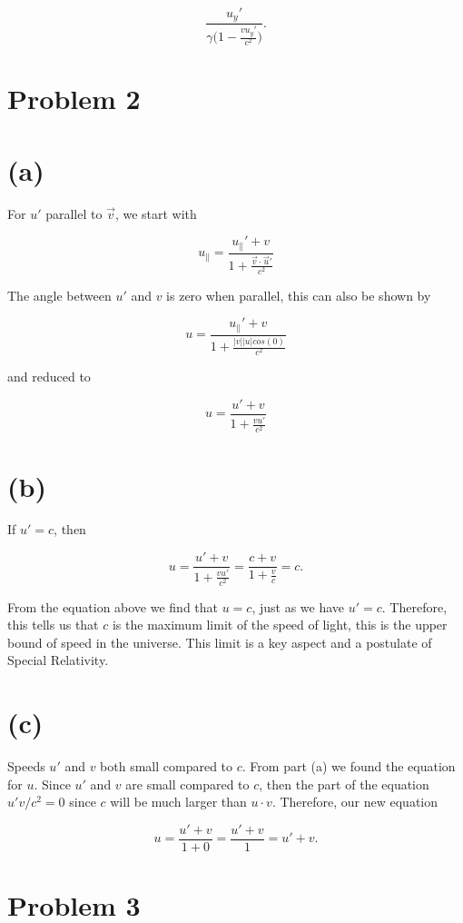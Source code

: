 \documentclass[11pt]{article}
\begin{document}
$$
\frac{u_{y}'}{\gamma\big(1 - \frac{v u_{y}'}{c^{2}}\big)}.
$$

\clearpage

\section*{Problem 2}

\section*{(a)}

For $u'$ parallel to $\vec{v}$, we start with 

$$
u_{\parallel} = \frac{u_{\parallel}' + v}{1+ \frac{\vec{v} \cdot \vec{u}'}{c^{2}}}
$$

The angle between $u'$ and $v$ is zero when parallel, this can also be shown by

$$
u =  \frac{u_{\parallel}' + v}{1+ \frac{|v||u|cos(0)}{c^{2}}}
$$

and reduced to

$$
u =  \frac{u' + v}{1+ \frac{v u'}{c^{2}}}
$$

\section*{(b)}

If $u' = c$, then

$$
u = \frac{u' + v}{1+ \frac{v u'}{c^{2}}} = \frac{c + v}{1+ \frac{v}{c}} = c.
$$

From the equation above we find that $u = c$, just as we have $u' =c$. Therefore, this tells us that $c$ is the maximum limit of the speed of light, this is the upper bound of speed in the universe. This limit is a key aspect and a postulate of Special Relativity. 

\section*{(c)}

Speeds $u'$ and $v$ both small compared to $c$. From part (a) we found the equation for $u$. Since $u'$ and $v$ are small compared to $c$, then the part of the equation $u'v/c^{2} = 0$ since $c$ will be much larger than $u \cdot v$. Therefore, our new equation

$$
u = \frac{u' + v}{1 + 0} = \frac{u' + v}{1} = u' + v.
$$

\clearpage

\section*{Problem 3}
\end{document}
